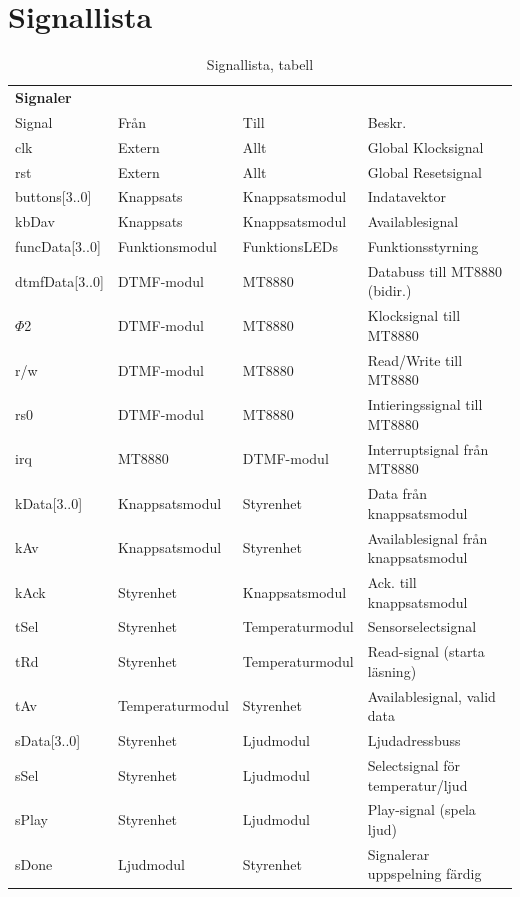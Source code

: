 \documentclass[a4paper,11pt]{article}
\begin{document}
	\section{Signallista}
	\begin{table} [H]
	\label{tab:signalTabell}
	\caption{Signallista, tabell} 
	\begin{tabular}{l l l l}
		{\bf Signaler}
		\\{Signal} & {Från} & {Till} & {Beskr.}\\
		\hline
		clk & Extern & Allt & Global Klocksignal\\
		rst & Extern & Allt & Global Resetsignal\\
		buttons[3..0] & Knappsats & Knappsatsmodul & Indatavektor\\
		kbDav & Knappsats & Knappsatsmodul & Availablesignal\\
		funcData[3..0] & Funktionsmodul & FunktionsLEDs & Funktionsstyrning\\
		dtmfData[3..0] & DTMF-modul & MT8880 & Databuss till MT8880 (bidir.)\\
		\(\Phi\)2 & DTMF-modul & MT8880 & Klocksignal till MT8880\\
		r/w & DTMF-modul & MT8880 & Read/Write till MT8880\\
		rs0 & DTMF-modul & MT8880 & Intieringssignal till MT8880\\
		irq & MT8880 & DTMF-modul & Interruptsignal från MT8880\\

		kData[3..0] & Knappsatsmodul & Styrenhet & Data från knappsatsmodul\\
		kAv & Knappsatsmodul & Styrenhet & Availablesignal från knappsatsmodul\\
		kAck & Styrenhet & Knappsatsmodul & Ack. till knappsatsmodul\\

		tSel & Styrenhet & Temperaturmodul & Sensorselectsignal\\
		tRd & Styrenhet & Temperaturmodul & Read-signal (starta läsning)\\
		tAv & Temperaturmodul & Styrenhet & Availablesignal, valid data\\

		sData[3..0] & Styrenhet & Ljudmodul & Ljudadressbuss\\
		sSel & Styrenhet & Ljudmodul & Selectsignal för temperatur/ljud\\
		sPlay & Styrenhet & Ljudmodul & Play-signal (spela ljud)\\
		sDone & Ljudmodul & Styrenhet & Signalerar uppspelning färdig\\


\end{tabular}
\end{table}
\end{document}
